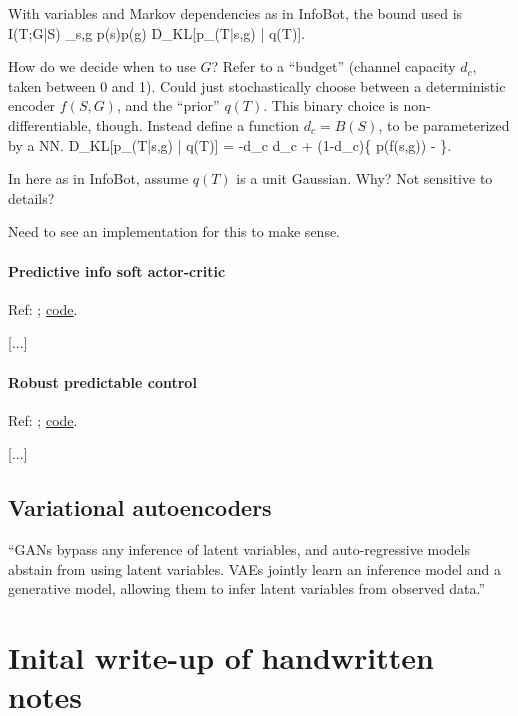 \documentclass[notitlepage,openany,11pt]{report}
\theoremstyle{plain}%
\numberwithin{equation}{section}
\begin{document}
With variables and Markov dependencies as in InfoBot, the bound used is
\be
I(T;G|S) \leq \sum_{s,g} p(s)p(g) D_{KL}[p_{}(T|s,g) | q(T)].
\ee

How do we decide when to use $G$? Refer to a ``budget'' (channel capacity $d_c$, taken between 0 and 1). Could just stochastically choose between a deterministic encoder $f(S,G)$, and the ``prior'' $q(T)$. This binary choice is non-differentiable, though. Instead define a function $d_c = B(S)$, to be parameterized by a NN. 
\be
D_{KL}[p_{}(T|s,g) | q(T)] = -d_c \log d_c + (1-d_c)\left\{ \log p(f(s,g)) - \log [d_c p(f(s,g)) + (1-d_c)] \right\}.
\ee

In here as in InfoBot, assume $q(T)$ is a unit Gaussian. Why? Not sensitive to details?

Need to see an implementation for this to make sense.



\subsubsection{Predictive info soft actor-critic}
Ref: \cite{LeeEtAl:20}; \href{https://github.com/google-research/pisac}{code}.


[...]


\subsubsection{Robust predictable control}
Ref: \cite{EysenbachEtAl:21a}; \href{https://ben-eysenbach.github.io/rpc/}{code}.

[...]


\section{Variational autoencoders}

``GANs bypass any inference of latent variables, and auto-regressive models abstain from using latent variables. VAEs jointly learn an inference model and a generative model, allowing them to infer latent variables from observed data.''



\chapter{Inital write-up of handwritten notes}
\end{document}
